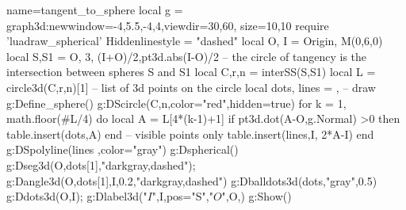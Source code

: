 \documentclass[border=5pt]{standalone}%
\begin{document}
\begin{luadraw}{name=tangent_to_sphere }
local g = graph3d:new{window={-4,5.5,-4,4},viewdir={30,60}, size={10,10}}
require 'luadraw_spherical'
Hiddenlinestyle = "dashed"
local O, I = Origin, M(0,6,0)
local S,S1 = {O, 3}, {(I+O)/2,pt3d.abs(I-O)/2}
-- the circle of tangency is the intersection between spheres S and S1
local C,r,n = interSS(S,S1) 
local L = circle3d(C,r,n)[1] -- list of 3d points on the circle
local dots, lines = {}, {}
-- draw
g:Define_sphere()
g:DScircle({C,n},{color="red",hidden=true})
for k = 1, math.floor(#L/4) do
    local A = L[4*(k-1)+1]
    if pt3d.dot(A-O,g.Normal) >0 then table.insert(dots,A) end -- visible points only
    table.insert(lines,{I, 2*A-I})
end
g:DSpolyline(lines ,{color="gray"})
g:Dspherical()
g:Dseg3d({O,dots[1]},"darkgray,dashed"); g:Dangle3d(O,dots[1],I,0.2,"darkgray,dashed")
g:Dballdots3d(dots,"gray",0.5)
g:Ddots3d({O,I}); g:Dlabel3d("$I$",I,{pos="S"},"$O$",O,{})
g:Show() 
\end{luadraw}
\end{document}
